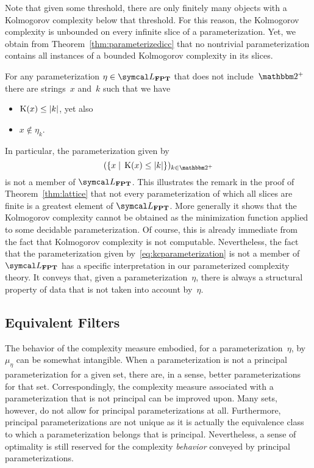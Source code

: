 Note that given some threshold, there are only finitely many objects with a Kolmogorov complexity below that threshold.
For this reason, the Kolmogorov complexity is unbounded on every infinite slice of a parameterization.
Yet, we obtain from Theorem~\ref{thm:parameterizedicc} that no nontrivial parameterization contains all instances of a bounded Kolmogorov complexity in its slices.
\begin{corollary}
\label{cor:parameterizedicc}%
  For any parameterization $\eta \in \calL_\cl{FPT}$ that does not include~$\binary^+$ there are strings~$x$ and~$k$ such that we have
  \begin{itemize}
  \item $\operatorname{K}(x) \le {\lvert k\rvert}$, yet also
  \item $x \notin \eta_k$.
  \end{itemize}
\end{corollary}

In particular, the parameterization given by
\begin{equation}
\label{eq:kcparameterization}
  (\{x \st \KC(x) \le \length{k}\})_{k \in \binary^+}
\end{equation}
is not a member of $\calL_\cl{FPT}$.
This illustrates the remark in the proof of Theorem~\ref{thm:lattice} that not every parameterization of which all slices are finite is a greatest element of $\calL_\cl{FPT}$.
More generally it shows that the Kolmogorov complexity cannot be obtained as the minimization function applied to some decidable parameterization.
Of course, this is already immediate from the fact that Kolmogorov complexity is not computable.
Nevertheless, the fact that the parameterization given by~\eqref{eq:kcparameterization} is not a member of $\calL_\cl{FPT}$ has a specific interpretation in our parameterized complexity theory.
It conveys that, given a parameterization~$\eta$, there is always a structural property of data that is not taken into account by~$\eta$.

\subsection{Equivalent Filters}
\label{sec:algorithmic:equivalent_filters}%
The behavior of the complexity measure embodied, for a parameterization~$\eta$, by $\mu_\eta$ can be somewhat intangible.
When a parameterization is not a principal parameterization for a given set, there are, in a sense, better parameterizations for that set.
Correspondingly, the complexity measure associated with a parameterization that is not principal can be improved upon.
Many sets, however, do not allow for principal parameterizations at all.
Furthermore, principal parameterizations are not unique as it is actually the equivalence class to which a parameterization belongs that is principal.
Nevertheless, a sense of optimality is still reserved for the complexity \emph{behavior} conveyed by principal parameterizations.

